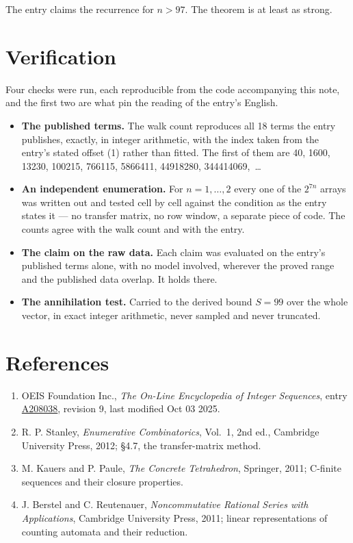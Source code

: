 \documentclass[11pt]{article}
\theoremstyle{definition}
\begin{document}
The entry claims the recurrence for $n > 97$. The theorem is at least as strong.

\section{Verification}

Four checks were run, each reproducible from the code accompanying this note, and the first two are what pin the reading of the entry's English.

\begin{itemize}

\item {\bfseries The published terms.} The walk count reproduces all 18 terms the entry publishes, exactly, in integer arithmetic, with the index taken from the entry's stated offset (1) rather than fitted. The first of them are 40, 1600, 13230, 100215, 766115, 5866411, 44918280, 344414069,~\dots

\item {\bfseries An independent enumeration.} For $n = 1,\dots,2$ every one of the $2^{7n}$ arrays was written out and tested cell by cell against the condition as the entry states it --- no transfer matrix, no row window, a separate piece of code. The counts agree with the walk count and with the entry.

\item {\bfseries The claim on the raw data.} Each claim was evaluated on the entry's published terms alone, with no model involved, wherever the proved range and the published data overlap. It holds there.

\item {\bfseries The annihilation test.} Carried to the derived bound $S = 99$ over the whole vector, in exact integer arithmetic, never sampled and never truncated.

\end{itemize}

\section{References}

\begin{enumerate}

\item OEIS Foundation Inc., \emph{The On-Line Encyclopedia of Integer Sequences}, entry \href{https://oeis.org/A208038}{A208038}, revision 9, last modified Oct 03 2025.

\item R. P. Stanley, \emph{Enumerative Combinatorics}, Vol.~1, 2nd ed., Cambridge University Press, 2012; \S4.7, the transfer-matrix method.

\item M. Kauers and P. Paule, \emph{The Concrete Tetrahedron}, Springer, 2011; C-finite sequences and their closure properties.

\item J. Berstel and C. Reutenauer, \emph{Noncommutative Rational Series with Applications}, Cambridge University Press, 2011; linear representations of counting automata and their reduction.

\end{enumerate}
\end{document}
